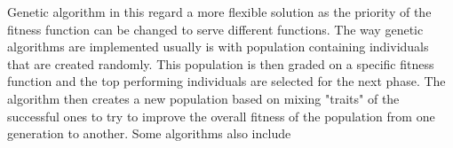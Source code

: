 \documentclass[conference]{IEEEtran}
\begin{document}
Genetic algorithm in this regard a more flexible solution as the priority of the fitness function can be changed to serve different functions. The way genetic algorithms are implemented usually is with population containing individuals that are created randomly. This population is then graded on a specific fitness function and the top performing individuals are selected for the next phase. The algorithm then creates a new population based on mixing "traits" of the successful ones to try to improve the overall fitness of the population from one generation to another. Some algorithms also include 
 

\end{document}
